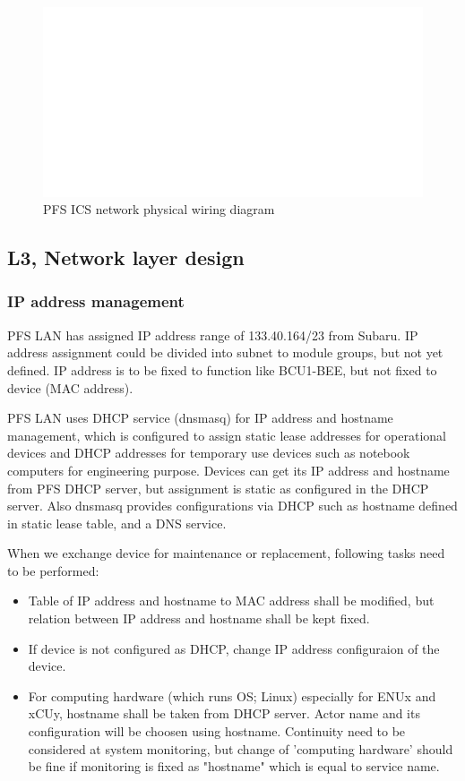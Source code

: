 \documentclass[a4paper,notitlepage]{article}
\begin{document}
\begin{figure}[htb]
  \begin{center}
    \includegraphics{pfs_network_physical.eps}
  \end{center}
  \caption{PFS ICS network physical wiring diagram}
  \label{fig:network_physical}
\end{figure}


\subsection{L3, Network layer design}

\subsubsection{IP address management}

PFS LAN has assigned IP address range of 133.40.164/23 from Subaru. 
IP address assignment could be divided into subnet to module groups, but 
not yet defined. IP address is to be fixed to function like BCU1-BEE, but not 
fixed to device (MAC address). 

PFS LAN uses DHCP service (dnsmasq) for IP address and hostname management, 
which is configured to assign static lease addresses for operational devices 
and DHCP addresses for temporary use devices such as notebook computers for 
engineering purpose. Devices can get its IP address and hostname from PFS DHCP 
server, but assignment is static as configured in the DHCP server. Also 
dnsmasq provides configurations via DHCP such as hostname defined in static 
lease table, and a DNS service. 

When we exchange device for maintenance or replacement, following tasks need 
to be performed:

\begin{itemize}
  \item Table of IP address and hostname to MAC address shall be modified, but 
    relation between IP address and hostname shall be kept fixed. 
  \item If device is not configured as DHCP, change IP address configuraion 
    of the device.
  \item For computing hardware (which runs OS; Linux) especially for ENUx and 
    xCUy, hostname shall be taken from DHCP server. Actor name and its 
    configuration will be choosen using hostname. Continuity need to be 
    considered at system monitoring, but change of 'computing hardware' should 
    be fine if monitoring is fixed as "hostname" which is equal to service 
    name. 
\end{itemize}
\end{document}

